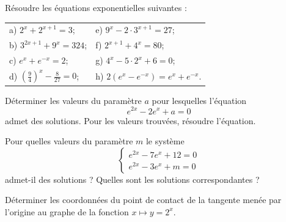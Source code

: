 \documentclass[12pt,french,oneside,a4paper]{memoir} %
\begin{document}
\begin{exo}
Résoudre les équations exponentielles suivantes :\\
  
  \begin{tabular}{ll}
  a) $\displaystyle{2^x+2^{x+1}=3}$;\qquad\qquad&
  e) $\displaystyle{9^x-2\cdot3^{x+1}=27}$;\\[3mm]
  b) $\displaystyle{3^{2x+1}+9^x=324}$;\qquad\qquad&
  f) $\displaystyle{2^{x+1}+4^x=80}$;\\[3mm]
  c) $\displaystyle{e^x+e^{-x}=2}$;\qquad\qquad&
  g) $\displaystyle{4^x-5\cdot2^x+6=0}$;\\[3mm]
  d) $\displaystyle{(\frac{9}{4})^x-\frac{8}{27}=0}$;\qquad\qquad&
  h) $\displaystyle{2(e^x-e^{-x})=e^x+e^{-x}}$.
  \end{tabular}
\end{exo}

\begin{exo}
Déterminer les valeurs du paramètre $a$ pour lesquelles
  l'équation
  \begin{equation*}
  e^{2x}-2e^x+a=0
\end{equation*}
  admet des solutions. Pour les valeurs trouvées, résoudre
  l'équation.
\end{exo}
\begin{exo}
Pour quelles valeurs du paramètre $m$ le système
  \begin{equation*}
  \left\{
  \begin{array}{l}
  e^{2x}-7e^x+12=0\\
  e^{2x}-3e^x+m=0
  \end{array}
  \right.
\end{equation*}
  admet-il des solutions ? Quelles sont les solutions correspondantes
  ?
\end{exo}
\begin{exo}
Déterminer les coordonnées du point de contact de la
  tangente menée par l'origine au graphe de la fonction $
  x\mapsto y=2^x$.
\end{exo}
\end{document}
